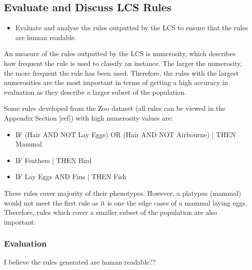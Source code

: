 \subsection{Evaluate and Discuss LCS Rules}
\begin{itemize}
	\item  Evaluate and analyse the rules outputted by the LCS to ensure that the rules are
human readable.
\end{itemize}
An measure of the rules outputted by the LCS is numerosity, which describes how frequent the rule is used to classify an instance. The larger the numerosity, the more frequent the rule has been used. Therefore, the rules with the largest numerosities are the most important in terms of getting a high accuracy in evaluation as they describe a larger subset of the population. 

Some rules developed from the Zoo dataset (all rules can be viewed in the Appendix Section [ref]) with high numerosity values are:
\begin{itemize}
	\item IF (Hair AND NOT Lay Eggs) OR (Hair AND NOT Airbourne) | THEN Mammal
	\item IF Feathers | THEN Bird
	\item IF Lay Eggs AND Fins | THEN Fish
\end{itemize}

These rules cover majority of their phenotypes. However, a platypus (mammal) would not meet the first rule as it is one the edge cases of a mammal laying eggs. Therefore, rules which cover a smaller subset of the population are also important. 

\subsubsection{Evaluation}
I believe the rules generated are human readable??

